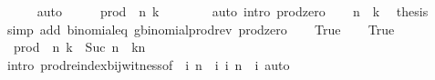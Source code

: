 \begin{isabellebody}
\ \ \ \ \isamarkupfalse%
\ auto\isanewline
\ \ \isamarkupfalse%
\ \isamarkupfalse%
\ {\isachardoublequoteopen}prod\ {\isacharparenleft}{\kern0pt}{\isacharparenleft}{\kern0pt}{\isacharminus}{\kern0pt}{\isacharparenright}{\kern0pt}\ n{\isacharparenright}{\kern0pt}\ {\isacharbraceleft}{\kern0pt}{}{\isachardot}{\kern0pt}{\isachardot}{\kern0pt}{\isacharless}{\kern0pt}k{\isacharbraceright}{\kern0pt}\ {\isacharequal}{\kern0pt}\ {}{\isachardoublequoteclose}\isanewline
\ \ \ \ \isamarkupfalse%
\ {\isacharparenleft}{\kern0pt}auto\ intro{\isacharcolon}{\kern0pt}\ prod{\isacharunderscore}{\kern0pt}zero{\isacharparenright}{\kern0pt}\isanewline
\ \ \isamarkupfalse%
\ {\isacartoucheopen}n\ {\isacharless}{\kern0pt}\ k{\isacartoucheclose}\ \isamarkupfalse%
\ {\isacharquery}{\kern0pt}thesis\isanewline
\ \ \ \ \isamarkupfalse%
\ {\isacharparenleft}{\kern0pt}simp\ add{\isacharcolon}{\kern0pt}\ binomial{\isacharunderscore}{\kern0pt}eq{\isacharunderscore}{\kern0pt}{}\ gbinomial{\isacharunderscore}{\kern0pt}prod{\isacharunderscore}{\kern0pt}rev\ prod{\isacharunderscore}{\kern0pt}zero{\isacharparenright}{\kern0pt}\isanewline
{}\isamarkupfalse%
\isanewline
\ \ \isamarkupfalse%
\ True\isanewline
\ \ \isamarkupfalse%
\ True\ \isamarkupfalse%
\ {\isacharasterisk}{\kern0pt}{\isacharcolon}{\kern0pt}\ {\isachardoublequoteopen}prod\ {\isacharparenleft}{\kern0pt}{\isacharparenleft}{\kern0pt}{\isacharminus}{\kern0pt}{\isacharparenright}{\kern0pt}\ n{\isacharparenright}{\kern0pt}\ {\isacharbraceleft}{\kern0pt}{}{\isachardot}{\kern0pt}{\isachardot}{\kern0pt}{\isacharless}{\kern0pt}k{\isacharbraceright}{\kern0pt}\ {\isacharequal}{\kern0pt}\ {\isasymProd}{\isacharbraceleft}{\kern0pt}Suc\ {\isacharparenleft}{\kern0pt}n\ {\isacharminus}{\kern0pt}\ k{\isacharparenright}{\kern0pt}{\isachardot}{\kern0pt}{\isachardot}{\kern0pt}n{\isacharbraceright}{\kern0pt}{\isachardoublequoteclose}\isanewline
\ \ \ \ \isamarkupfalse%
\ {\isacharparenleft}{\kern0pt}intro\ prod{\isachardot}{\kern0pt}reindex{\isacharunderscore}{\kern0pt}bij{\isacharunderscore}{\kern0pt}witness{\isacharbrackleft}{\kern0pt}of\ {\isacharunderscore}{\kern0pt}\ {\isachardoublequoteopen}{\isasymlambda}i{\isachardot}{\kern0pt}\ n\ {\isacharminus}{\kern0pt}\ i{\isachardoublequoteclose}\ {\isachardoublequoteopen}{\isasymlambda}i{\isachardot}{\kern0pt}\ n\ {\isacharminus}{\kern0pt}\ i{\isachardoublequoteclose}{\isacharbrackright}{\kern0pt}{\isacharparenright}{\kern0pt}\ auto\isanewline

\end{isabellebody}
